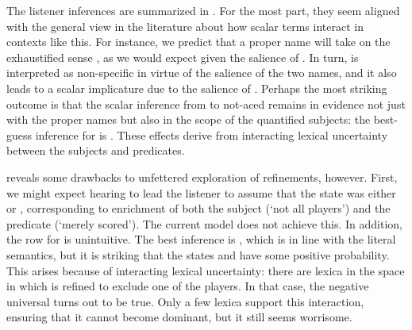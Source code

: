 \documentclass[leqno,12pt]{article}
\begin{document}
The listener inferences are summarized in . For
the most part, they seem aligned with the general view in the
literature about how scalar terms interact in contexts like this. For
instance, we predict that a proper name  will take on the
exhaustified sense , as we would expect given the
salience of . In turn,  is interpreted as
non-specific in virtue of the salience of the two names, and it also
leads to a scalar implicature due to the salience of
. Perhaps the most striking outcome is that the scalar
inference from  to not-aced remains in evidence not just
with the proper names but also in the scope of the quantified
subjects: the best-guess inference for  is
.  These effects derive from interacting lexical uncertainty
between the subjects and predicates.

 reveals some drawbacks to unfettered exploration
of refinements, however. First, we might expect hearing  to lead the listener to assume that the state was
either  or , corresponding to enrichment of both
the subject (`not all players') and the predicate (`merely
scored'). The current model does not achieve this. In addition, the
row for  is unintuitive. The best inference is
, which is in line with the literal semantics, but it is
striking that the states  and  have some positive
probability. This arises because of interacting lexical uncertainty:
there are lexica in the space in which  is refined to
exclude one of the players. In that case, the negative universal turns
out to be true. Only a few lexica support this interaction, ensuring
that it cannot become dominant, but it still seems worrisome.
\end{document}
